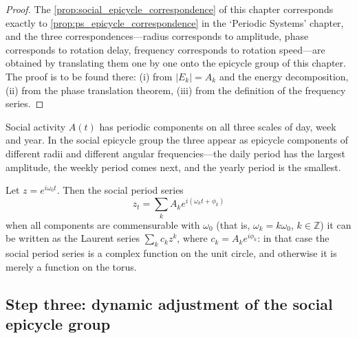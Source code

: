 \begin{proof}
The \cref{prop:social_epicycle_correspondence} of this chapter corresponds exactly to \cref{prop:ps_epicycle_correspondence} in the `Periodic Systems' chapter,
and the three correspondences---radius corresponds to amplitude, phase corresponds to rotation delay, frequency corresponds to rotation speed---are obtained by translating them one by one onto the epicycle group of this chapter.
The proof is to be found there: (i) from $|E_k|=A_k$ and the energy decomposition, (ii) from the phase translation theorem, (iii) from the definition of the frequency series.
\end{proof}

\begin{example}\label{ex:social_activity_series}
Social activity $A(t)$ has periodic components on all three scales of day, week and year. In the social epicycle group the three appear as epicycle components of different radii and different angular frequencies---the daily period has the largest amplitude, the weekly period comes next, and the yearly period is the smallest.
\end{example}

\begin{remark}\label{rem:social_series_complex}
Let $z=e^{i\omega_0t}$. Then the social period series
\[
z_t=\sum_k A_k e^{i(\omega_k t+\phi_k)}
\]
when all components are commensurable with $\omega_0$ (that is, $\omega_k=k\omega_0$, $k\in\mathbb Z$) it can be written as the Laurent series $\sum_k c_k z^k$, where $c_k=A_k e^{i\phi_k}$: in that case the social period series is a complex function on the unit circle, and otherwise it is merely a function on the torus.
\end{remark}

\subsection{Step three: dynamic adjustment of the social epicycle group}

